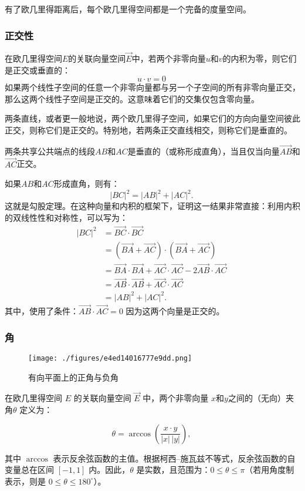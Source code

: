 有了欧几里得距离后，每个欧几里得空间都是一个完备的度量空间。
\subsubsection{正交性}
在欧几里得空间$E$的关联向量空间$\overrightarrow{E}$中，若两个非零向量$u$和$v$的内积为零，则它们是正交或垂直的：
$$
u \cdot v = 0~
$$
如果两个线性子空间的任意一个非零向量都与另一个子空间的所有非零向量正交，那么这两个线性子空间是正交的。这意味着它们的交集仅包含零向量。

两条直线，或者更一般地说，两个欧几里得子空间，如果它们的方向向量空间彼此正交，则称它们是正交的。特别地，若两条正交直线相交，则称它们是垂直的。

两条共享公共端点的线段$AB$和$AC$是垂直的（或称形成直角），当且仅当向量$\overrightarrow{AB}$和$\overrightarrow{AC}$正交。

如果$AB$和$AC$形成直角，则有：
$$
|BC|^2 = |AB|^2 + |AC|^2.~
$$
这就是勾股定理。在这种向量和内积的框架下，证明这一结果非常直接：利用内积的双线性性和对称性，可以写为：
$$
\begin{aligned}
|BC|^2 
&= \overrightarrow{BC} \cdot \overrightarrow{BC} \\[4pt]
&= (\overrightarrow{BA} + \overrightarrow{AC}) \cdot (\overrightarrow{BA} + \overrightarrow{AC}) \\[4pt]
&= \overrightarrow{BA} \cdot \overrightarrow{BA} + \overrightarrow{AC} \cdot \overrightarrow{AC} - 2 \overrightarrow{AB} \cdot \overrightarrow{AC} \\[4pt]
&= \overrightarrow{AB} \cdot \overrightarrow{AB} + \overrightarrow{AC} \cdot \overrightarrow{AC} \\[4pt]
&= |AB|^2 + |AC|^2.
\end{aligned}~
$$
其中，使用了条件：$\overrightarrow{AB} \cdot \overrightarrow{AC} = 0$
因为这两个向量是正交的。
\subsubsection{角}
\begin{figure}[ht]
\centering
\texttt{[image: ./figures/e4ed14016777e9dd.png]}
\caption{有向平面上的正角与负角} \label{fig_OJLDkj_3}
\end{figure}
在欧几里得空间 $E$ 的关联向量空间 $\overrightarrow{E}$ 中，两个非零向量 $x$和$y$之间的（无向）夹角$\theta$ 定义为：

$$
\theta = \arccos\!\left(\frac{x \cdot y}{|x|\,|y|}\right),~
$$

其中 $\arccos$ 表示反余弦函数的主值。根据柯西–施瓦兹不等式，反余弦函数的自变量总在区间 $[-1, 1]$ 内。因此，$\theta$ 是实数，且范围为：$0 \leq \theta \leq \pi$（若用角度制表示，则是 $0 \leq \theta \leq 180^\circ$）。

